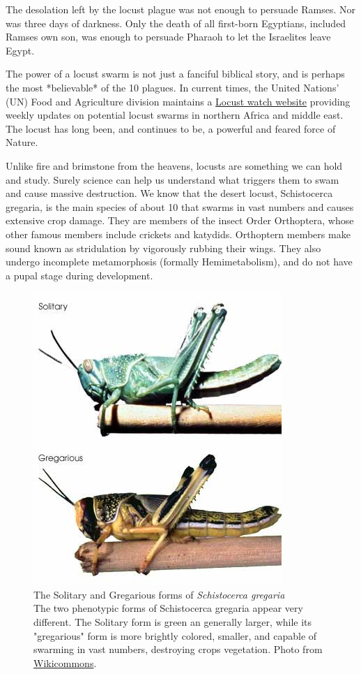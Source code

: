 The desolation left by the locust plague was not enough to persuade Ramses. Nor was three days of darkness. Only the death of all first-born Egyptians, included Ramses own son, was enough to persuade Pharaoh to let the Israelites leave Egypt.

The power of a locust swarm is not just a fanciful biblical story, and is perhaps the most *believable* of the 10 plagues. In current times, the United Nations' (UN) Food and Agriculture division maintains a \href{http://www.fao.org/ag/locusts/en/info/info/news/index.html}{Locust watch website} providing weekly updates on potential locust swarms in northern Africa and middle east. The locust has long been, and continues to be, a powerful and feared force of Nature.

Unlike fire and brimstone from the heavens, locusts are something we can hold and study. Surely science can help us understand what triggers them to swam and cause massive destruction. We know that the desert locust, Schistocerca gregaria, is the main species of about 10 that swarms in vast numbers and causes extensive crop damage. They are members of the insect Order Orthoptera, whose other famous members include crickets and katydids. Orthoptern members make sound known as stridulation by vigorously rubbing their wings. They also undergo incomplete metamorphosis (formally Hemimetabolism), and do not have a pupal stage during development. 

\begin{figure}[htbp]
	\centering 
	\includegraphics{Figures/DesertLocust.jpeg}
	\caption[The Solitary and Gregarious forms of \textit{Schistocerca gregaria}]
	{
		The Solitary and Gregarious forms of \textit{Schistocerca gregaria}\\[0.25cm]
		The two phenotypic forms of Schistocerca gregaria appear very different.  The Solitary form is green an generally larger, while its "gregarious" form is more brightly colored, smaller, and capable of swarming in vast numbers, destroying crops vegetation. Photo from \href{http://www.wikicommons.com}{Wikicommons}.
	}
	\label{fig:Locust}
\end{figure}


